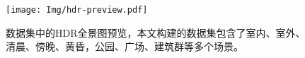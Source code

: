 \begin{figure}[!htbp]
  \centering
  \texttt{[image: Img/hdr-preview.pdf]}
  \caption[光照估计数据集预览]{
    \label{fig:hdr-preview}
    数据集中的HDR全景图预览，本文构建的数据集包含了室内、室外、清晨、傍晚、黄昏，公园、广场、建筑群等多个场景。
  }
\end{figure}